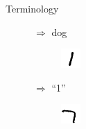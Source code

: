 \documentclass[xcolor={usenames,dvipsnames}]{beamer}
\begin{document}
\begin{frame}{Terminology}
\begin{itemize}
\begin{figure}[H]
\begin{subfigure}{.1\textwidth}
			\end{subfigure} $\Rightarrow$ dog
		\end{figure}
		\begin{figure}[H]
			\begin{subfigure}{.1\textwidth}
				\includegraphics[width=\textwidth]{MNIST_cl_1_0} 
			\end{subfigure} $\Rightarrow$ ``1''
			\begin{subfigure}{.1\textwidth}
				\includegraphics[width=\textwidth]{MNIST_cl_7_0}

\end{subfigure}
\end{figure}
\end{itemize}
\end{frame}
\end{document}
